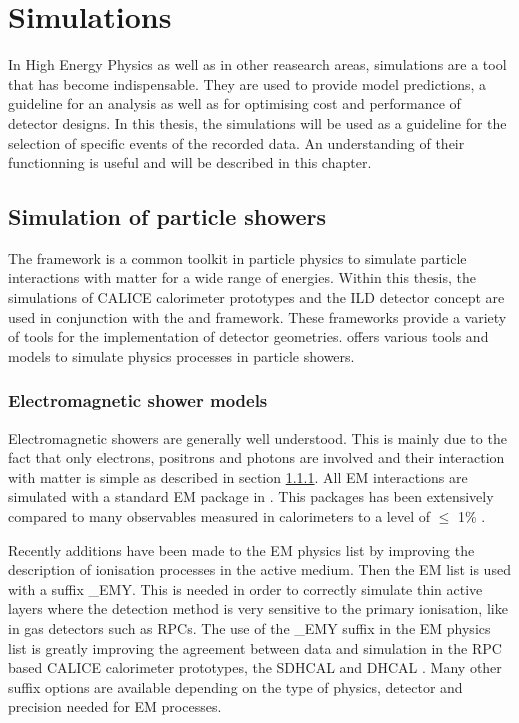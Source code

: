 \chapter{\geant Simulations}
\label{chap:G4Simulation}

In High Energy Physics as well as in other reasearch areas, simulations are a tool that has become indispensable. They are used to provide model predictions, a guideline for an analysis as well as for optimising cost and performance of detector designs. In this thesis, the simulations will be used as a guideline for the selection of specific events of the recorded data. An understanding of their functionning is useful and will be described in this chapter.

\section{Simulation of particle showers}

The \geant framework \cite{Agostinelli2003} is a common toolkit in particle physics to simulate particle interactions with matter for a wide range of energies. Within this thesis, the simulations of CALICE calorimeter prototypes and the ILD detector concept are used in conjunction with the \mokka \cite{Freitas2003} and \ddhep \cite{Frank2014} framework. These frameworks provide a variety of tools for the implementation of detector geometries. \geant offers various tools and models to simulate physics processes in particle showers.

\subsection{Electromagnetic shower models}

Electromagnetic showers are generally well understood. This is mainly due to the fact that only electrons, positrons and photons are involved and their interaction with matter is simple as described in section \ref{}. All EM interactions are simulated with a standard EM package in \geant \cite{Ivanchenko2010}. This packages has been extensively compared to many observables measured in calorimeters to a level of $\leq$ 1\% \cite{Apostolakis2015}.

Recently additions have been made to the \geant EM physics list by improving the description of ionisation processes in the active medium. Then the EM list is used with a suffix \_{}EMY. This is needed in order to correctly simulate thin active layers where the detection method is very sensitive to the primary ionisation, like in gas detectors such as RPCs. The use of the \_{}EMY suffix in the EM physics list is greatly improving the agreement between data and simulation in the RPC based CALICE calorimeter prototypes, the SDHCAL and DHCAL \cite{Neubueser2016}. Many other suffix options are available depending on the type of physics, detector and precision needed for EM processes.

